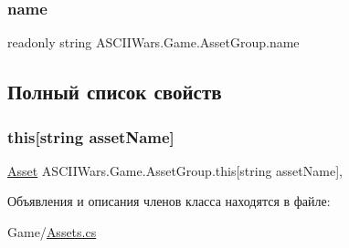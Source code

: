 \subsubsection{\texorpdfstring{name}{name}}
{\footnotesize\ttfamily readonly string A\+S\+C\+I\+I\+Wars.\+Game.\+Asset\+Group.\+name}



\subsection{Полный список свойств}
\hypertarget{class_a_s_c_i_i_wars_1_1_game_1_1_asset_group_ada6ec78bb13c41b4f8309f91b4adeecc}{}\label{class_a_s_c_i_i_wars_1_1_game_1_1_asset_group_ada6ec78bb13c41b4f8309f91b4adeecc} 
\subsubsection{\texorpdfstring{this[string asset\+Name]}{this[string assetName]}}
{\footnotesize\ttfamily \hyperlink{class_a_s_c_i_i_wars_1_1_game_1_1_asset}{Asset} A\+S\+C\+I\+I\+Wars.\+Game.\+Asset\+Group.\+this\mbox{[}string asset\+Name\mbox{]}\hspace{0.3cm}{\ttfamily [get]}, {\ttfamily [set]}}



Объявления и описания членов класса находятся в файле\+:\begin{DoxyCompactItemize}
\item 
Game/\hyperlink{_assets_8cs}{Assets.\+cs}\end{DoxyCompactItemize}
